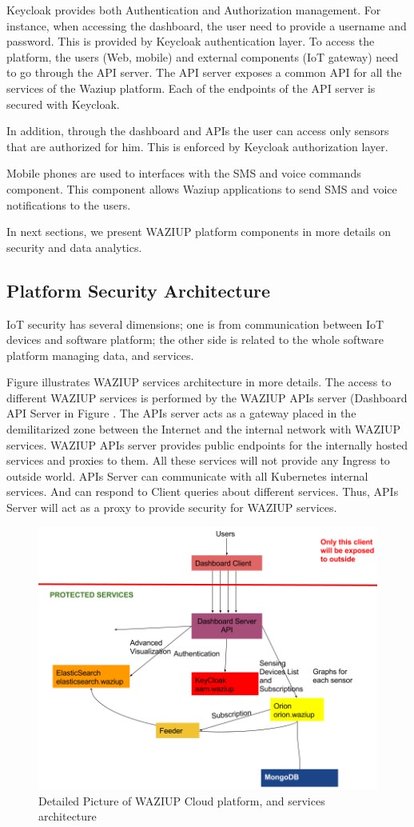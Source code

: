 Keycloak provides both Authentication and Authorization management.
For instance, when accessing the dashboard, the user need to provide a username and password.
This is provided by Keycloak authentication layer.
To access the platform, the users (Web, mobile) and external components (IoT gateway) need to go through the API server.
The API server exposes a common API for all the services of the Waziup platform.
Each of the endpoints of the API server is secured with Keycloak.

In addition, through the dashboard and APIs the user can access only sensors that are authorized for him.
This is enforced by Keycloak authorization layer.

Mobile phones are used to interfaces with the SMS and voice commands component.
This component allows Waziup applications to send SMS and voice notifications to the users.

In next sections, we present WAZIUP platform components in more details on security and data analytics.
\subsection{Platform Security Architecture}
IoT security has several dimensions; one is from communication between IoT devices and software platform; the other side is related to the whole software platform managing data, and services.

Figure \label{fig-services} illustrates WAZIUP services architecture in more details. The access to different WAZIUP services is performed by the WAZIUP APIs server (Dashboard API Server in Figure \label{fig-services}. The APIs server acts as a gateway placed in the demilitarized zone between the Internet and the internal network with WAZIUP services. WAZIUP APIs server provides public endpoints for the internally hosted services and proxies to them. All these services will not provide any Ingress to outside world. APIs Server can communicate with all Kubernetes internal services. And can respond to Client queries about different services. Thus, APIs Server will act as a proxy to provide security for WAZIUP services.


\begin{figure}[htb]
\centering
\includegraphics[width=.6\linewidth]{figures/ServicesArchitecture.png}
\caption{Detailed Picture of WAZIUP Cloud platform, and services architecture}
\label{fig-services}
\end{figure}

